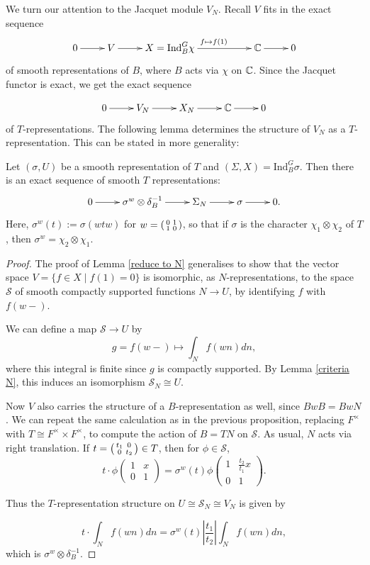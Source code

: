 We turn our attention to the Jacquet module $V_N$. Recall $V$ fits in the exact sequence
$$\xymatrix{0 \ar[r] & V \ar[r] & X = \mathrm{Ind}_B^G \chi \ar[rr]^{f \mapsto f(1)} && \CC \ar[r] & 0}$$ of smooth representations of $B$, where $B$ acts via $\chi$ on $\mathbb{C}$. Since the Jacquet functor is exact, we get the exact sequence

$$\xymatrix{0 \ar[r] & V_N \ar[r] & X_N \ar[r] & \CC \ar[r] & 0}$$ of $T$-representations. The following lemma determines the structure of $V_N$ as a $T$-representation. This can be stated in more generality:

\begin{lemma}
    Let $(\sigma, U)$ be a smooth representation of $T$ and $(\Sigma, X) = \mathrm{Ind}_B^G \sigma$. Then there is an exact sequence of smooth $T$ representations:
    $$\xymatrix{0 \ar[r] & \sigma^w \otimes \delta_B^{-1} \ar[r] & \Sigma_N \ar[r] & \sigma \ar[r] & 0.}$$
    Here, $\sigma^w(t) := \sigma(wtw)$ for $w=\begin{psmallmatrix}
        0&1\\1&0
    \end{psmallmatrix}$, so that if $\sigma$ is the character $\chi_1 \otimes \chi_2$ of $T$, then $\sigma^w = \chi_2\otimes \chi_1$.
\end{lemma}
\begin{proof}
    The proof of Lemma \ref{reduce to N} generalises to show that the vector space $V = \{f \in X \mid f(1)=0\}$ is isomorphic, as $N$-representations, to the space $\mathcal S$ of smooth compactly supported functions $N \to U$, by identifying $f$ with $f(w-)$.



    We can define a map $\mathcal S \to U$ by 
    $$g=f(w-) \mapsto \int_N f(wn) dn,$$ where this integral is finite since $g$ is compactly supported. By Lemma \ref{criteria N}, this induces an isomorphism $\mathcal S_N \cong U$.


    Now $V$ also carries the structure of a $B$-representation as well, since $BwB=BwN$. We can repeat the same calculation as in the previous proposition, replacing $F^\times$ with $T\cong F^\times \times F^\times$, to compute the action of $B=TN$ on $\mathcal S$. As usual, $N$ acts via right translation. If $t=\begin{psmallmatrix}
        t_1&0 \\0 & t_2
    \end{psmallmatrix} \in T$, then for $\phi \in \mathcal S$, 
    $$t\cdot \phi \begin{pmatrix}
        1&x\\0&1
    \end{pmatrix} = \sigma^w(t) \phi \begin{pmatrix}
        1&\frac{t_2}{t_1}x \\ 0&1
    \end{pmatrix}.$$

    Thus the $T$-representation structure on $U \cong \mathcal S_N \cong V_N$ is given by 

    $$t \cdot \int_N f(wn)dn = \sigma^w(t) \left| \frac{t_1}{t_2} \right| \int_N f(wn)dn,$$
    which is $\sigma^w \otimes \delta_B^{-1}$.
\end{proof}

